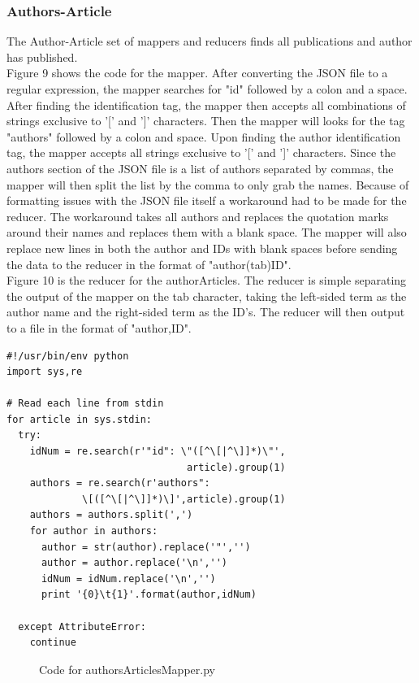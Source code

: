 \documentclass[10pt,journal,compsoc]{IEEEtran}
\begin{document}
\subsubsection{Authors-Article}
The Author-Article set of mappers and reducers finds all publications and author has published.\\
\indent Figure 9 shows the code for the mapper. After converting the JSON file to a regular expression, the mapper searches for "id" followed by a colon and a space. After finding the identification tag, the mapper then accepts all combinations of strings exclusive to '[' and ']' characters. Then the mapper will looks for the tag "authors" followed by a colon and space. Upon finding the author identification tag, the mapper accepts all strings exclusive to '[' and ']' characters. Since the authors section of the JSON file is a list of authors separated by commas, the mapper will then split the list by the comma to only grab the names. Because of formatting issues with the JSON file itself a workaround had to be made for the reducer. The workaround takes all authors and replaces the quotation marks around their names and replaces them with a blank space. The mapper will also replace new lines in both the author and IDs with blank spaces before sending the data to the reducer in the format of "author(tab)ID".\\
\indent Figure 10 is the reducer for the authorArticles. The reducer is simple separating the output of the mapper on the tab character, taking the left-sided term as the author name and the right-sided term as the ID's. The reducer will then output to a file in the format of "author,ID".

\begin{verbatim}
#!/usr/bin/env python
import sys,re

# Read each line from stdin
for article in sys.stdin:
  try:
    idNum = re.search(r'"id": \"([^\[|^\]]*)\"',
                               article).group(1)
    authors = re.search(r'authors":
             \[([^\[|^\]]*)\]',article).group(1)
    authors = authors.split(',')
    for author in authors:
      author = str(author).replace('"','')
      author = author.replace('\n','')
      idNum = idNum.replace('\n','')
      print '{0}\t{1}'.format(author,idNum)

  except AttributeError:
    continue
\end{verbatim}
\begin{figure}[htp]
\centering
\caption{Code for authorsArticlesMapper.py}
\label{fig: authorsArticlesMapper.py}
\end{figure}
\end{document}
